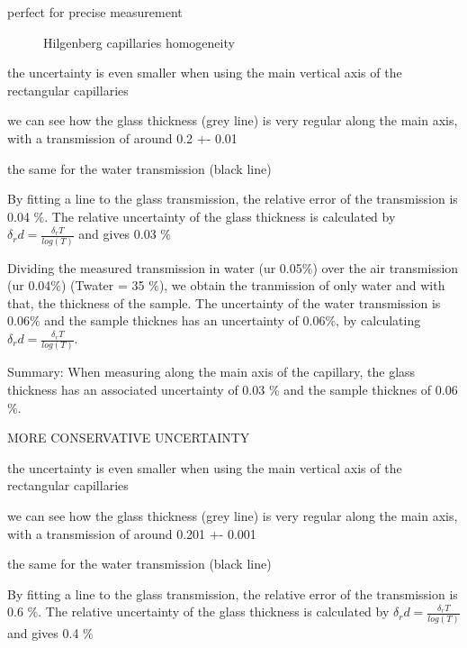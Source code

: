 perfect for precise measurement

\begin{figure}%
	\centering
		\caption{Hilgenberg capillaries homogeneity}
\end{figure}

the uncertainty is even smaller when using the main vertical axis of the rectangular capillaries

we can see how the glass thickness (grey line) is very regular along the main axis, with a transmission of around 0.2 +- 0.01

the same for the water transmission (black line)

By fitting a line to the glass transmission, the relative error of the transmission is 0.04 $\%$. The relative uncertainty of the glass thickness is calculated by $\delta_r d = \frac{\delta_r T}{log(T)}$ and gives 0.03 $\%$

Dividing the measured transmission in water (ur 0.05$\%$) over the air transmission (ur 0.04$\%$) (Twater = 35 $\%$), we obtain the tranmission of only water and with that, the thickness of the sample. The uncertainty of the water transmission is 0.06$\%$ and the sample thicknes has an uncertainty of 0.06$\%$, by calculating $\delta_r d = \frac{\delta_r T}{log(T)}$.

Summary: When measuring along the main axis of the capillary, the glass thickness has an associated uncertainty of 0.03 $\%$ and the sample thicknes of 0.06 $\%$.


MORE CONSERVATIVE UNCERTAINTY

the uncertainty is even smaller when using the main vertical axis of the rectangular capillaries

we can see how the glass thickness (grey line) is very regular along the main axis, with a transmission of around 0.201 +- 0.001

the same for the water transmission (black line)

By fitting a line to the glass transmission, the relative error of the transmission is 0.6 $\%$. The relative uncertainty of the glass thickness is calculated by $\delta_r d = \frac{\delta_r T}{log(T)}$ and gives 0.4 $\%$

